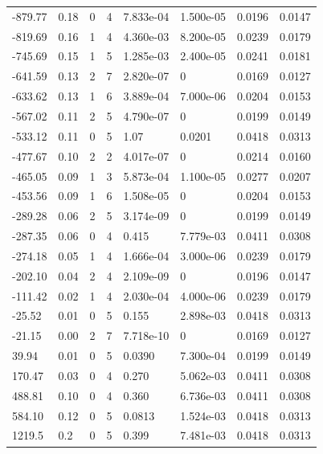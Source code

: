 \documentclass[preview]{standalone}
\begin{document}
{{\begin{tabular}{L{1.2cm}C{1.2cm} C{0.3cm}C{0.5cm} C{1.4cm}C{1.4cm} C{1.4cm}C{1.4cm}}
  -879.77  &  0.18  & 0     &  4 &  7.833e-04  & 1.500e-05  & 0.0196 &  0.0147   \\ 
  -819.69  &  0.16  & 1     &  4 &  4.360e-03  & 8.200e-05  & 0.0239 &  0.0179   \\ 
  -745.69  &  0.15  & 1     &  5 &  1.285e-03  & 2.400e-05  & 0.0241 &  0.0181   \\ 
  -641.59  &  0.13  & 2     &  7 &  2.820e-07  & 0  & 0.0169 &  0.0127   \\ 
  -633.62  &  0.13  & 1     &  6 &  3.889e-04  & 7.000e-06  & 0.0204 &  0.0153   \\ 
  -567.02  &  0.11  & 2     &  5 &  4.790e-07  & 0  & 0.0199 &  0.0149   \\ 
  -533.12  &  0.11  & 0     &  5 &  1.07  & 0.0201  & 0.0418 &  0.0313   \\ 
  -477.67  &  0.10  & 2     &  2 &  4.017e-07  & 0  & 0.0214 &  0.0160   \\ 
  -465.05  &  0.09  & 1     &  3 &  5.873e-04  & 1.100e-05  & 0.0277 &  0.0207   \\ 
  -453.56  &  0.09  & 1     &  6 &  1.508e-05  & 0  & 0.0204 &  0.0153   \\ 
  -289.28  &  0.06  & 2     &  5 &  3.174e-09  & 0  & 0.0199 &  0.0149   \\ 
  -287.35  &  0.06  & 0     &  4 &  0.415  & 7.779e-03  & 0.0411 &  0.0308   \\ 
  -274.18  &  0.05  & 1     &  4 &  1.666e-04  & 3.000e-06  & 0.0239 &  0.0179   \\ 
  -202.10  &  0.04  & 2     &  4 &  2.109e-09  & 0  & 0.0196 &  0.0147   \\ 
  -111.42  &  0.02  & 1     &  4 &  2.030e-04  & 4.000e-06  & 0.0239 &  0.0179   \\ 
  -25.52  &  0.01  & 0     &  5 &  0.155  & 2.898e-03  & 0.0418 &  0.0313   \\ 
  -21.15  &  0.00  & 2     &  7 &  7.718e-10  & 0  & 0.0169 &  0.0127   \\ 
  39.94  &  0.01  & 0     &  5 &  0.0390  & 7.300e-04  & 0.0199 &  0.0149   \\ 
  170.47  &  0.03  & 0     &  4 &  0.270  & 5.062e-03  & 0.0411 &  0.0308   \\ 
  488.81  &  0.10  & 0     &  4 &  0.360  & 6.736e-03  & 0.0411 &  0.0308   \\ 
  584.10  &  0.12  & 0     &  5 &  0.0813  & 1.524e-03  & 0.0418 &  0.0313   \\ 
  1219.5  &   0.2  & 0     &  5 &  0.399  & 7.481e-03  & 0.0418 &  0.0313   \\ 

\end{tabular}}}
\end{document}
